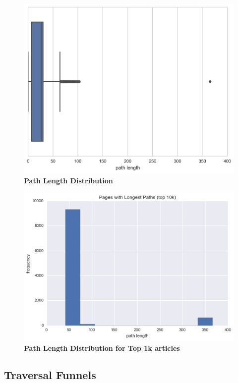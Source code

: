 \documentclass[pre,twocolumn,twoside,superscriptaddress,floatfix, aps, 10pt]{revtex4-1}
\begin{document}
\begin{figure}[tp!]
  \centering	
  \includegraphics[width=\columnwidth]{graphics/path_lengths_boxplot.png}
  \caption{
    \textbf{Path Length Distribution}
  }
  \label{fig:Path Length Distribution}
\end{figure}

\begin{figure}[tp!]
  \centering	
  \includegraphics[width=\columnwidth]{graphics/top_1k_path_length.png}  
  \caption{
    \textbf{Path Length Distribution for Top 1k articles}
  }
  \label{fig:Top 1k Path Length Distribution}
\end{figure}


\subsection{Traversal Funnels}
\end{document}
